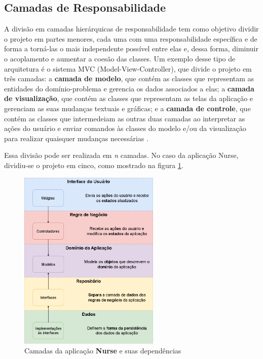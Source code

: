\subsection{Camadas de Responsabilidade}
\label{cap4:SubSec:CamadasResponsabilidade}
A divisão em camadas hierárquicas de responsabilidade tem como objetivo dividir o projeto em partes menores, cada uma com uma responsabilidade específica e de forma a torná-las o mais independente possível entre elas \cite{Faust2020} e, dessa forma, diminuir o acoplamento e aumentar a coesão das classes. Um exemplo desse tipo de arquitetura é o sistema MVC (Model-View-Controller), que divide o projeto em três camadas: a \textbf{camada de modelo}, que contém as classes que representam as entidades do domínio-problema e gerencia os dados associados a elas; a \textbf{camada de visualização}, que contém as classes que representam as telas da aplicação e gerenciam as suas mudanças textuais e gráficas; e a \textbf{camada de controle}, que contém as classes que intermedeiam as outras duas camadas ao interpretar as ações do usuário e enviar comandos às classes do modelo e/ou da visualização para realizar quaisquer mudanças necessárias \cite{burbeck1987mvc}.

Essa divisão pode ser realizada em \textit{n} camadas. No caso da aplicação Nurse, dividiu-se o projeto em cinco, como mostrado na figura \ref{fig:4_1_1_camadas_nurse}.

\begin{figure}[!ht]
  \centering
  \includegraphics[width=0.6\textwidth]{figuras/cap4/4_1_1_camadas_nurse.png}
  \caption{Camadas da aplicação \textbf{Nurse} e suas dependências}
  \label{fig:4_1_1_camadas_nurse}
\end{figure}

